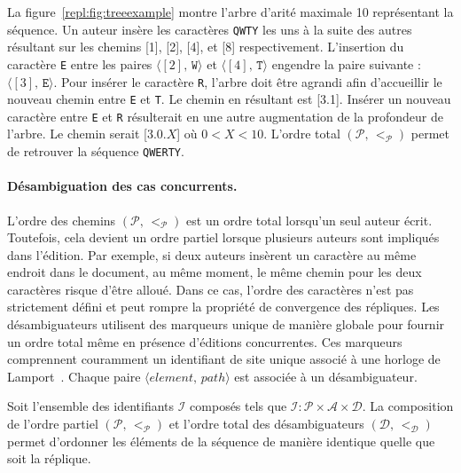 La figure~\ref{repl:fig:treeexample} montre l'arbre d'arité maximale 10
représentant la séquence. Un auteur insère les caractères \texttt{QWTY} les uns
à la suite des autres résultant sur les chemins [1], [2], [4], et [8]
respectivement. L'insertion du caractère \texttt{E} entre les paires
$\langle [2],\, \texttt{W} \rangle$ et $\langle [4],\, \texttt{T} \rangle$
engendre la paire suivante : $\langle [3],\, \texttt{E} \rangle$. Pour insérer
le caractère \texttt{R}, l'arbre doit être agrandi afin d'accueillir le nouveau
chemin entre \texttt{E} et \texttt{T}. Le chemin en résultant est [3.1]. Insérer
un nouveau caractère entre \texttt{E} et \texttt{R} résulterait en une autre
augmentation de la profondeur de l'arbre. Le chemin serait [3.0.$X$] où
$0<X<10$. L'ordre total $(\mathcal{P},\, <_\mathcal{P})$ permet de retrouver la
séquence \texttt{QWERTY}.


\paragraph{Désambiguation des cas concurrents.}

L'ordre des chemins $(\mathcal{P},\, <_\mathcal{P})$ est un ordre total
lorsqu'un seul auteur écrit. Toutefois, cela devient un ordre partiel lorsque
plusieurs auteurs sont impliqués dans l'édition. Par exemple, si deux auteurs
insèrent un caractère au même endroit dans le document, au même moment, le même
chemin pour les deux caractères risque d'être alloué. Dans ce cas, l'ordre des
caractères n'est pas strictement défini et peut rompre la propriété de
convergence des répliques. Les désambiguateurs utilisent des marqueurs unique de
manière globale pour fournir un ordre total même en présence d'éditions
concurrentes. Ces marqueurs comprennent couramment un identifiant de site unique
associé à une horloge de Lamport~\cite{lamport1978time}. Chaque paire
$\langle element,\, path\rangle$ est associée à un désambiguateur.

Soit l'ensemble des identifiants $\mathcal{I}$ composés tels que
$\mathcal{I} : \mathcal{P} \times \mathcal{A} \times \mathcal{D}$. La
composition de l'ordre partiel $(\mathcal{P},\,<_\mathcal{P})$ et l'ordre total
des désambiguateurs $(\mathcal{D},\, <_\mathcal{D})$ permet d'ordonner les
éléments de la séquence de manière identique quelle que soit la réplique.

